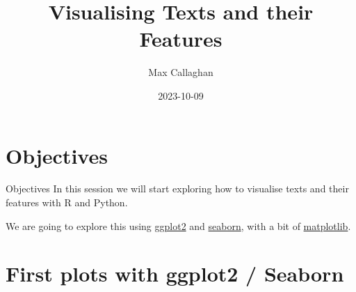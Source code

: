 \documentclass[
  10pt,
  ignorenonframetext,
  aspectratio=169]{beamer}
\title{Visualising Texts and their Features}
\author{Max Callaghan}
\date{2023-10-09}
\begin{document}
\frame{\titlepage}

\hypertarget{objectives}{%
\section{Objectives}\label{objectives}}

\begin{frame}{Objectives}
\protect\hypertarget{objectives-1}{}
In this session we will start exploring how to visualise texts and their
features with R and Python.

We are going to explore this using
\href{https://ggplot2.tidyverse.org/}{ggplot2} and
\href{https://seaborn.pydata.org/}{seaborn}, with a bit of
\href{https://matplotlib.org/}{matplotlib}.
\end{frame}

\hypertarget{first-plots-with-ggplot2-seaborn}{%
\section{First plots with ggplot2 /
Seaborn}\label{first-plots-with-ggplot2-seaborn}}
\end{document}

